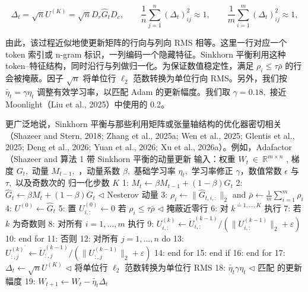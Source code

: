 \documentclass[
  10
]{article}
\begin{document}
\[
\Delta _ { t } = \sqrt { n } U ^ { ( K ) } = \sqrt { n } D _ { r } \widehat { G } _ { t } D _ { c } , \qquad \frac { 1 } { n } \sum _ { j = 1 } ^ { n } ( \Delta _ { t } ) _ { i j } ^ { 2 } \approx 1 , \qquad \frac { 1 } { m } \sum _ { i = 1 } ^ { m } ( \Delta _ { t } ) _ { i j } ^ { 2 } \approx 1 ,\tag{7}
\]

由此，该过程近似地使更新矩阵的行向与列向 RMS 相等。这里一行对应一个 token 索引或 n-gram 标识，一列编码一个隐藏特征。Sinkhorn 平衡利用这种 token--特征结构，同时沿行与列做归一化。为保证数值稳定性，满足 \(\rho _ { i } \leqslant \tau \bar { \rho }\) 的行会被掩蔽。因子 \(\sqrt { n }\) 将单位行 \(\ell _ { 2 }\) 范数转换为单位行向 RMS。另外，我们按 \(\widetilde { \eta _ { t } } = \gamma \eta _ { t }\) 调整有效学习率，以匹配 Adam 的更新幅度。我们取 \(\gamma = 0 . 1 8 ,\) 接近 Moonlight（Liu et al., 2025）中使用的 0.2。

更广泛地说，Sinkhorn 平衡与那些利用矩阵或张量轴结构的优化器密切相关（Shazeer and Stern, 2018; Zhang et al., 2025a; Wen et al., 2025; Glentis et al., 2025; Deng et al., 2026; Yuan et al., 2026; Xu et al., 2026a）。例如，Adafactor（Shazeer and
算法 1 带 Sinkhorn 平衡的动量更新 输入：权重
\(W _ { t } \ \in \ \mathbb { R } ^ { m \times n }\) , 梯度
\(G _ { t } ,\) 动量 \(M _ { t - 1 } ,\) ，动量系数
\(\beta ,\) 基础学习率 \(\eta _ { t } ,\) 学习率修正 $\gamma$，数值常数 $\epsilon$ 与 \(\tau ,\) 以及奇数次的
归一化步数 \(K\) 1:
\(M _ { t } \gets \beta M _ { t - 1 } + ( 1 - \beta ) G _ { t }\) 2:
\(\widehat { G } _ { t } \gets \beta M _ { t } + ( 1 - \beta ) G _ { t }\)
$\triangleleft$ Nesterov 动量 3:
\(\rho _ { i } \gets \| \widehat { G } _ { t , i , : } \| _ { 2 }\) and
\(\textstyle { \bar { \rho } } \gets { \frac { 1 } { m } } \sum _ { i = 1 } ^ { m } \rho _ { i }\)
4: \(U ^ { ( 0 ) } \gets \widehat { G } _ { t }\) 5: 置
\(U _ { i , : } ^ { ( 0 ) } \gets 0\) 若
\(\rho _ { i } \leqslant \tau \bar { \rho }\) $\triangleleft$ 掩蔽近零行 6:
对 \(k ^ { \stackrel { \prime } { = } 1 , \ldots , K }\) 执行 7: 若 $k$ 为奇数则 8: 对所有 \(i = 1 , \ldots , m\) 执行 9:
\(U _ { i , : } ^ { ( k ) } \gets \dot { U } _ { i , : } ^ { ( k - 1 ) } / ( \| U _ { i , : } ^ { ( k - 1 ) } \| _ { 2 } + \varepsilon )\)
10: end for 11: 否则 12: 对所有 \(j = 1 , \dotsc , n\) do 13:
\(U _ { : , j } ^ { ( k ) ^ { \prime } } \gets \dot { U } _ { : , j } ^ { ( k - 1 ) } / ( \lVert U _ { : , j } ^ { ( k - 1 ) } \rVert _ { 2 } + \varepsilon )\)
14: end for 15: end if 16: end for 17:
\(\Delta _ { t } \gets \sqrt { n } U ^ { ( K ) }\) $\triangleleft$ 将单位行
\(\ell _ { 2 }\) 范数转换为单位行 RMS 18:
\(\widetilde { \eta _ { t } }  \gamma \eta _ { t }\) $\triangleleft$ 匹配
的更新幅度 19:
\(W _ { t + 1 } \gets W _ { t } - \widetilde { \eta _ { t } } \Delta _ { t }\)
\end{document}
